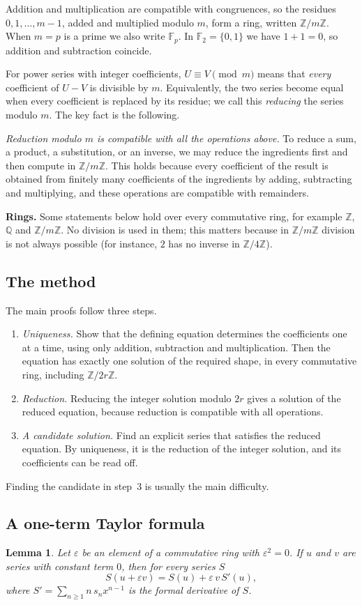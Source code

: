 \documentclass[11pt,a4paper]{article}
\newtheorem{lemma}[theorem]{Lemma}
\theoremstyle{definition}
\theoremstyle{remark}
\newcommand{\Z}{\mathbb{Z}}
\newcommand{\Q}{\mathbb{Q}}
\newcommand{\F}{\mathbb{F}}
\newcommand{\para}[1]{\par\medskip\noindent\textbf{#1}\enspace}
\begin{document}
Addition and multiplication are compatible with congruences, so the residues $0,1,\dots,m-1$, added and multiplied
modulo $m$, form a ring, written $\Z/m\Z$. When $m=p$ is a prime we also write $\F_p$. In $\F_2=\{0,1\}$ we have $1+1=0$,
so addition and subtraction coincide.

For power series with integer coefficients, $U\equiv V\pmod m$ means that \emph{every} coefficient of $U-V$ is
divisible by $m$. Equivalently, the two series become equal when every coefficient is replaced by its residue; we call
this \emph{reducing} the series modulo $m$. The key fact is the following.

\emph{Reduction modulo $m$ is compatible with all the operations above.} To reduce a sum, a product, a substitution, or
an inverse, we may reduce the ingredients first and then compute in $\Z/m\Z$. This holds because every
coefficient of the result is obtained from finitely many coefficients of the ingredients by adding, subtracting and
multiplying, and these operations are compatible with remainders.

\para{Rings.} Some statements below hold over every commutative ring, for example $\Z$, $\Q$ and $\Z/m\Z$. No
division is used in them; this matters because in $\Z/m\Z$ division is not always possible (for instance, $2$ has no inverse in
$\Z/4\Z$).

\subsection{The method}
The main proofs follow three steps.
\begin{enumerate}
\item \emph{Uniqueness.} Show that the defining equation determines the coefficients one at a time, using only
addition, subtraction and multiplication. Then the equation has exactly one solution of the required shape, in every
commutative ring, including $\Z/2r\Z$.
\item \emph{Reduction.} Reducing the integer solution modulo $2r$ gives a solution of the reduced equation,
because reduction is compatible with all operations.
\item \emph{A candidate solution.} Find an explicit series that satisfies the reduced equation. By uniqueness, it is
the reduction of the integer solution, and its coefficients can be read off.
\end{enumerate}
Finding the candidate in step~3 is usually the main difficulty.
\subsection{A one-term Taylor formula}
\begin{lemma}\label{lem:taylor}
Let $\varepsilon$ be an element of a commutative ring with $\varepsilon^2=0$. If $u$ and $v$ are series with constant
term $0$, then for every series $S$
\[
S(u+\varepsilon v)=S(u)+\varepsilon\,v\,S'(u),
\]
where $S'=\sum_{n\ge1}n\,s_nx^{n-1}$ is the formal derivative of $S$.
\end{lemma}
\end{document}
